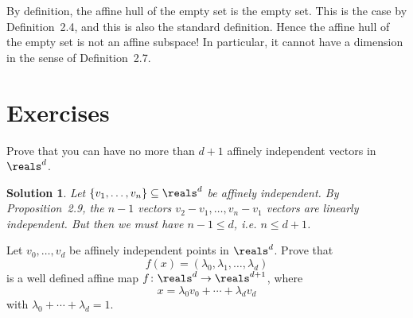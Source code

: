 \documentclass[article, a4paper, 11pt, oneside]{memoir}
\numberwithin{equation}{chapter}
\theoremstyle{nonumberplain}
\newtheorem{solution}{Solution}
\begin{document}
\begin{remarkbreak}
    By definition, the affine hull of the empty set is the empty set. This is the case by Definition~2.4, and this is also the standard definition. Hence the affine hull of the empty set is not an affine subspace! In particular, it cannot have a dimension in the sense of Definition~2.7.
\end{remarkbreak}


\section*{Exercises}


\begin{exerciseframed*}[10]
    Prove that you can have no more than $d+1$ affinely independent vectors in $\reals^d$.
\end{exerciseframed*}

\begin{solution}
    Let $\{v_1, \ldots, v_n\} \subseteq \reals^d$ be affinely independent. By Proposition~2.9, the $n-1$ vectors $v_2 - v_1, \ldots, v_n - v_1$ vectors are linearly independent. But then we must have $n-1 \leq d$, i.e. $n \leq d+1$.
\end{solution}


\begin{exerciseframed*}[11]
    Let $v_0, \ldots, v_d$ be affinely independent points in $\reals^d$. Prove that
    \begin{equation*}
        f(x) = (\lambda_0, \lambda_1, \ldots, \lambda_d)
    \end{equation*}
    is a well defined affine map $f \colon \reals^d \to \reals^{d+1}$, where
    \begin{equation*}
        x = \lambda_0 v_0 + \cdots + \lambda_d v_d
    \end{equation*}
    with $\lambda_0 + \cdots + \lambda_d = 1$.
\end{exerciseframed*}
\end{document}
